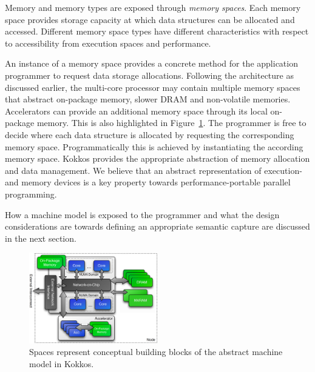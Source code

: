 Memory and memory types are exposed through \emph{memory spaces}. Each memory space provides storage capacity at which data structures can be allocated and accessed. Different memory space types have different characteristics with respect to accessibility from execution spaces and performance. 

An instance of a memory space provides a concrete method for the application programmer to request data storage allocations. Following the architecture as discussed earlier, the multi-core processor may contain multiple memory spaces that abstract on-package memory, slower DRAM and non-volatile memories. Accelerators can provide an additional memory space through its local on-package memory. This is also highlighted in Figure~\ref{fig:spaces}. The programmer is free to decide where each data structure is allocated by requesting the corresponding memory space. Programmatically this is achieved by instantiating the according memory space. Kokkos provides the appropriate abstraction of memory allocation and data management. We believe that an abstract representation of execution- and memory devices is a key property towards performance-portable parallel programming.

How a machine model is exposed to the programmer and what the design considerations are towards defining an appropriate semantic capture are discussed in the next section.


\begin{figure}

\includegraphics[width=0.5\textwidth]{img/KokkosSpaces.png}
\caption{Spaces represent conceptual building blocks of the abstract machine model in Kokkos.}
\label{fig:execspace}
\label{fig:spaces}
\end{figure}
